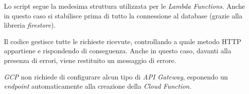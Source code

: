 Lo script segue la medesima struttura utilizzata per le \textit{Lambda Functions}. Anche in questo caso si stabilisce prima di tutto la connessione al database (grazie alla libreria \textit{firestore}).

Il codice gestisce tutte le richieste ricevute, controllando a quale metodo HTTP appartiene e rispondendo di conseguenza. Anche in questo caso, davanti alla presenza di errori, viene restituito un messaggio di errore.

\textit{GCP} non richiede di configurare alcun tipo di \textit{API Gateway}, esponendo un \textit{endpoint} automaticamente alla creazione della \textit{Cloud Function}.
